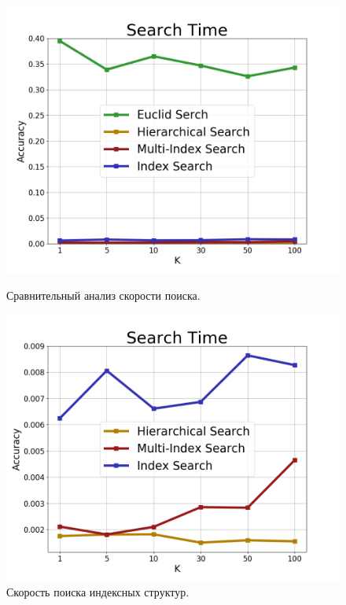 \begin{figure}[h]
\begin{minipage}[h]{0.49\linewidth}
\includegraphics[width=1\linewidth]{Images/SearchTime.png}
\caption{Сравнительный анализ скорости поиска.}
\label{ris:searchtime}
\end{minipage}
\hfill
\begin{minipage}[h]{0.49\linewidth}
\includegraphics[width=1\linewidth]{Images/SearchTimeIndex.png}
\caption{Скорость поиска индексных структур.}
\label{ris:searchtimeindex}
\end{minipage}
\end{figure}

